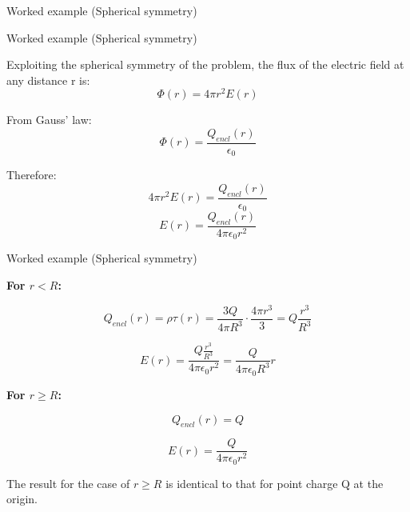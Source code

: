 {\begin{frame}{Worked example (Spherical symmetry)}
\end{frame}

%
%
%

\begin{frame}{Worked example (Spherical symmetry)}

  Exploiting the spherical symmetry of the problem,
  the flux of the electric field at any distance r is:
  \begin{equation*}
    \Phi(r) = 4\pi r^2 E(r)
  \end{equation*}

  From Gauss' law:
  \begin{equation*}
    \Phi(r) = \frac{Q_{encl}(r)}{\epsilon_0}
  \end{equation*}

  Therefore:
  \begin{equation*}
    4\pi r^2 E(r) = \frac{Q_{encl}(r)}{\epsilon_0}
  \end{equation*}
  \begin{equation*}
    E(r) = \frac{Q_{encl}(r)}{4 \pi \epsilon_0 r^2}
  \end{equation*}

\end{frame}

%
%
%

\begin{frame}{Worked example (Spherical symmetry)}

  {\bf For $r < R$:}

  \begin{equation*}
    Q_{encl}(r) =  \rho \tau(r) = \frac{3Q}{4\pi R^3} \cdot \frac{4\pi r^3}{3} = Q \frac{r^3}{R^3}
  \end{equation*}

  \begin{equation*}
    E(r) = \frac{Q \frac{r^3}{R^3}}{4 \pi \epsilon_0 r^2} = \frac{Q}{4 \pi \epsilon_0 R^3} r
  \end{equation*}

  {\bf For $r \ge R$:}

  \begin{equation*}
    Q_{encl}(r) =  Q
  \end{equation*}

  \begin{equation*}
    E(r) = \frac{Q}{4 \pi \epsilon_0 r^2}
  \end{equation*}

  The result for the case of $r \ge R$  is identical to that for point charge Q at the origin.

\end{frame}

} %



